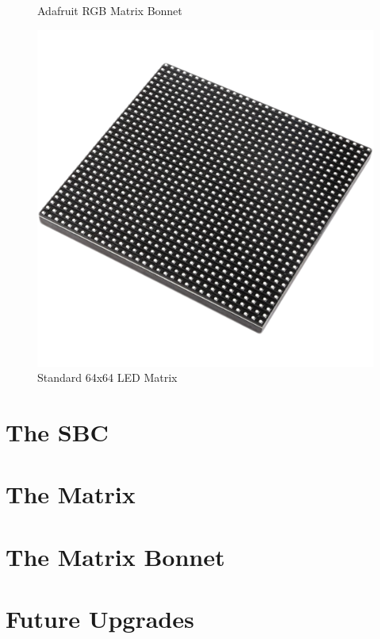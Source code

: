 \begin{figure}[h]
\begin{minipage}[b]{0.32\textwidth}
        \caption*{Adafruit RGB Matrix Bonnet}
    \end{minipage}
    \begin{minipage}[b]{0.32\textwidth}
        \centering
        \includegraphics[width=\textwidth]{tesi/img/hardware_components/matrix.png}
        \caption*{Standard 64x64 LED Matrix}
    \end{minipage}
\end{figure}


\section{The SBC}

\section{The Matrix}

\section{The Matrix Bonnet}

\section{Future Upgrades}
